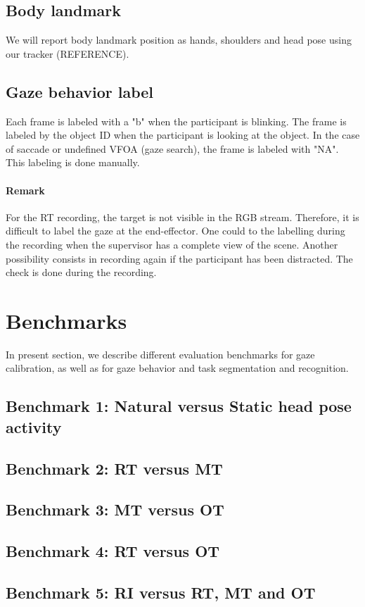 \documentclass[11pt,a4paper]{article}
\begin{document}
\subsection{Body landmark}
We will report body landmark position as hands, shoulders and head pose using our tracker (REFERENCE).

\subsection{Gaze behavior label}
Each frame is labeled with a "b" when the participant is blinking. The frame is labeled by the object ID when the participant is looking at the object. In the case of saccade or undefined VFOA (gaze search), the frame is labeled with "NA". This labeling is done manually. 
\paragraph{Remark}
For the RT recording, the target is not visible in the RGB stream. Therefore, it is difficult to label the gaze at the end-effector. One could to the labelling during the recording when the supervisor has a complete view of the scene. Another possibility consists in recording again if the participant has been distracted. The check is done during the recording.

\section{Benchmarks}
\label{Benchmarks}
In present section, we describe different evaluation benchmarks for gaze calibration, as well as for gaze behavior and task segmentation and recognition.
\subsection{Benchmark 1: Natural versus Static head pose activity}
\subsection{Benchmark 2: RT versus MT} 
\subsection{Benchmark 3: MT versus OT}
\subsection{Benchmark 4: RT versus OT}
\subsection{Benchmark 5: RI versus RT, MT and OT}
\end{document}
